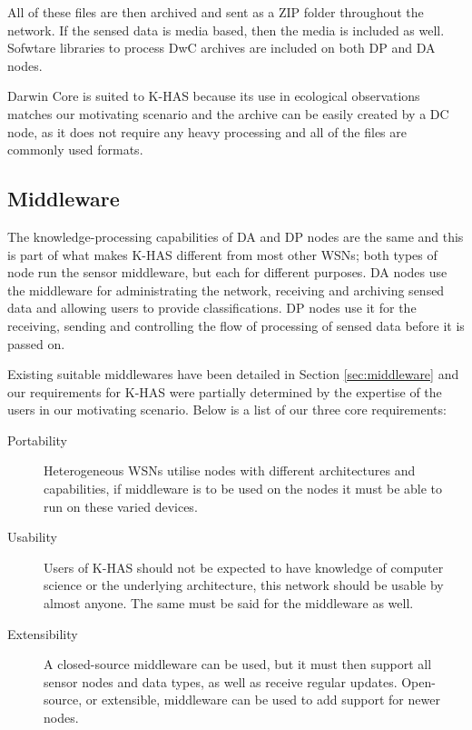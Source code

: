 % 


All of these files are then archived and sent as a ZIP folder throughout the network. If the sensed data is media based, then the media is included as well. Sofwtare libraries to process DwC archives are included on both DP and DA nodes.

Darwin Core is suited to K-HAS because its use in ecological observations matches our motivating scenario and the archive can be easily created by a DC node, as it does not require any heavy processing and all of the files are commonly used formats.
	
	\subsection{Middleware}
	The knowledge-processing capabilities of DA and DP nodes are the same and this is part of what makes K-HAS different from most other WSNs; both types of node run the sensor middleware, but each for different purposes. DA nodes use the middleware for administrating the network, receiving and archiving sensed data and allowing users to provide classifications. DP nodes use it for the receiving, sending and controlling the flow of processing of sensed data before it is passed on.
	
	Existing suitable middlewares have been detailed in Section \ref{sec:middleware} and our requirements for K-HAS were partially determined by the expertise of the users in our motivating scenario. Below is a list of our three core requirements:
	\begin{description}
		\item[Portability] Heterogeneous WSNs utilise nodes with different architectures and capabilities, if middleware is to be used on the nodes it must be able to run on these varied devices. 
		\item[Usability] Users of K-HAS should not be expected to have knowledge of computer science or the underlying architecture, this network should be usable by almost anyone. The same must be said for the middleware as well.
		\item[Extensibility] A closed-source middleware can be used, but it must then support all sensor nodes and data types, as well as receive regular updates. Open-source, or extensible, middleware can be used to add support for newer nodes.
	\end{description}
	

